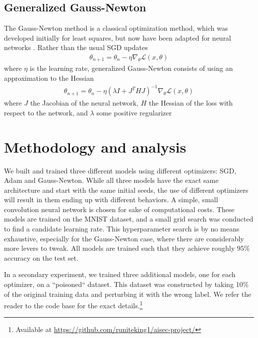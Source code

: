 \documentclass{article}
\begin{document}
    \subsection{Generalized Gauss-Newton}
    The Gauss-Newton method is a classical optimization method, which was developed initially for least squares, but now have been adapted for neural networks \citep{botev2017practicalgaussnewtonoptimisationdeep}.
    Rather than the usual SGD updates
    \begin{align*}
        \theta_{n+1} = \theta_n - \eta \nabla_{\theta} \mathcal L(x, \theta)
    \end{align*}
    where $\eta$ is the learning rate, generalized Gauss-Newton consists of using an approximation to the Hessian
    \begin{align*}
        \theta_{n+1} = \theta_n - \eta (\lambda I + J^THJ)^{-1} \nabla_{\theta} \mathcal L(x, \theta)
    \end{align*}
    where $J$ the Jacobian of the neural network, $H$ the Hessian of the loss with respect to the network, and $\lambda$ some positive regularizer


    \section{Methodology and analysis}
    We built and trained three different models using different optimizers: SGD, Adam and Gauss-Newton.
    While all three models have the exact same architecture and start with the same initial seeds, the use of different optimizers will result in them ending up with different behaviors.
    A simple, small convolution neural network is chosen for sake of computational costs.
    These models are trained on the MNIST dataset, and a small grid search was conducted to find a candidate learning rate.
    This hyperparameter search is by no means exhaustive, especially for the Gauss-Newton case, where there are considerably more levers to tweak.
    All models are trained such that they achieve roughly 95\% accuracy on the test set.

    In a secondary experiment, we trained three additional models, one for each optimizer, on a ``poisoned`` dataset.
    This dataset was constructed by taking 10\% of the original training data and perturbing it with the wrong label.
    We refer the reader to the code base for the exact details.\footnote{Available at \url{https://github.com/runiteking1/aisec-project/}}
\end{document}
